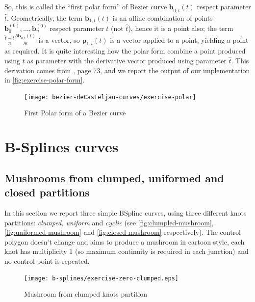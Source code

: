 \documentclass{article}
\begin{document}
So, this is called the ``first polar form'' of Bezier curve $\mathbf{b}_{0, \hat{t}}(t)$
respect parameter $\hat{t}$. Geometrically, the term $\mathbf{b}_{1, t}(t)$ is an affine
combination of points $\mathbf{b}_{0}^{(0)},\ldots,\mathbf{b}_{n}^{(0)}$ respect parameter
$t$ (not $\hat{t}$), hence it is a point also; the term
        $\frac{\hat{t}-t}{n}\frac{\partial \mathbf{b}_{0, \hat{t}}(t) }{\partial t} $
is a vector, so $\mathbf{p}_{1, \hat{t}}(t)$ is a vector applied to a point, yielding a point
as required. It is quite interesting how the polar form combine a point produced using $t$
as parameter with the derivative vector produced using  parameter $\hat{t}$. This derivation
comes from \cite{Farin}, page 73, and we report the output of our implementation in
\autoref{fig:exercise-polar-form}.

\begin{figure}[h!]
  \centering
  \texttt{[image: bezier-deCasteljau-curves/exercise-polar]}
  \caption{First Polar form of a Bezier curve}
  \label{fig:exercise-polar-form}
\end{figure}


\newpage

\section{B-Splines curves}

\subsection{Mushrooms from clumped, uniformed and closed partitions}

In this section we report three simple BSpline curves, using
three different knots partitions: \emph{clumped, uniform} and
\emph{cyclic} (see \autoref{fig:clumpled-mushroom},
    \autoref{fig:uniformed-mushroom} and \autoref{fig:closed-mushroom}
respectively). The control polygon doesn't change
  and aims to produce a mushroom in cartoon style, each knot
has multiplicity $1$ (so maximum continuity is required in each junction)
and no control point is repeated.

\begin{figure}[h!]
  \centering
  \texttt{[image: b-splines/exercise-zero-clumped.eps]}
  \caption{Mushroom from clumped knots partition}
  \label{fig:clumpled-mushroom}
\end{figure}
\end{document}
